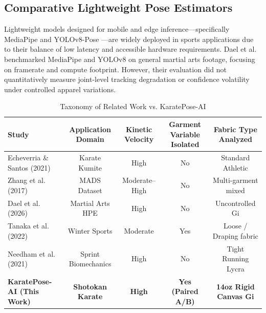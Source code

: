 \subsection{Comparative Lightweight Pose Estimators}
Lightweight models designed for mobile and edge inference—specifically MediaPipe \cite{lugaresi2019mediapipe} and YOLOv8-Pose \cite{jocher2023yolov8}—are widely deployed in sports applications due to their balance of low latency and accessible hardware requirements. Dael et al. \cite{dael2026comparative} benchmarked MediaPipe and YOLOv8 on general martial arts footage, focusing on framerate and compute footprint. However, their evaluation did not quantitatively measure joint-level tracking degradation or confidence volatility under controlled apparel variations.

\begin{table}[t]
\centering
\caption{Taxonomy of Related Work vs. KaratePose-AI}
\label{tab:related_work_matrix}
\begin{tabular}{lcccc}
\hline
\textbf{Study} & \textbf{Application Domain} & \textbf{Kinetic Velocity} & \textbf{Garment Variable Isolated} & \textbf{Fabric Type Analyzed} \\
\hline
Echeverria \& Santos (2021) \cite{echeverria2021modeling} & Karate Kumite & High & No & Standard Athletic \\
Zhang et al. (2017) \cite{zhang2017martial} & MADS Dataset & Moderate--High & No & Multi-garment mixed \\
Dael et al. (2026) \cite{dael2026comparative} & Martial Arts HPE & High & No & Uncontrolled Gi \\
Tanaka et al. (2022) \cite{looseclothes2022hfr} & Winter Sports & Moderate & Yes & Loose / Draping fabric \\
Needham et al. (2021) \cite{sensors2021sprinting} & Sprint Biomechanics & High & No & Tight Running Lycra \\
\hline
\textbf{KaratePose-AI (This Work)} & \textbf{Shotokan Karate} & \textbf{High} & \textbf{Yes (Paired A/B)} & \textbf{14oz Rigid Canvas Gi} \\
\hline
\end{tabular}
\end{table}
